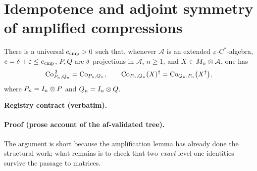 \section{Idempotence and adjoint symmetry of amplified compressions}\label{sec:compcb-amplified-compression-identities}

\begin{lemma}\label{lem:compcb-amplified-compression-identities}
There is a universal $e_{\mathrm{cmp}}>0$ such that, whenever $\mathcal A$ is an
extended $\varepsilon$-$C^*$-algebra, $e=\delta+\varepsilon\le e_{\mathrm{cmp}}$, $P,Q$ are
$\delta$-projections in $\mathcal A$, $n\ge1$, and $X\in M_{n}\otimes \mathcal A$, one has
\begin{equation}\label{eq:aci-both}
  \mathrm{Co}_{P_n,Q_n}^{\,2}=\mathrm{Co}_{P_n,Q_n},
  \qquad
  \mathrm{Co}_{P_n,Q_n}(X)^{\dagger}=\mathrm{Co}_{Q_n,P_n}\bigl(X^{\dagger}\bigr),
\end{equation}
where $P_n=I_{n}\otimes P$ and $Q_n=I_{n}\otimes Q$.
\end{lemma}

\noindent\textbf{Registry contract (verbatim).}

\paragraph{Proof (prose account of the af-validated tree).}
The argument is short because the amplification lemma has already done the structural
work; what remains is to check that two \emph{exact} level-one identities survive the
passage to matrices.


